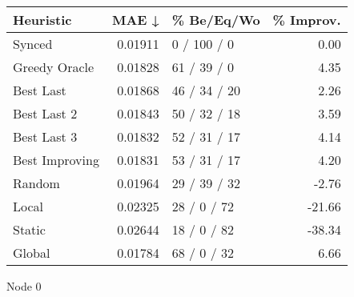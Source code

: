 \begin{tabular}{lrlr}
\toprule
\textbf{Heuristic} & \textbf{MAE ↓} & \textbf{\% Be/Eq/Wo} & \textbf{\% Improv.} \\
\midrule
            Synced &        0.01911 &          0 / 100 / 0 &                0.00 \\
     Greedy Oracle &        0.01828 &          61 / 39 / 0 &                4.35 \\
         Best Last &        0.01868 &         46 / 34 / 20 &                2.26 \\
       Best Last 2 &        0.01843 &         50 / 32 / 18 &                3.59 \\
       Best Last 3 &        0.01832 &         52 / 31 / 17 &                4.14 \\
    Best Improving &        0.01831 &         53 / 31 / 17 &                4.20 \\
            Random &        0.01964 &         29 / 39 / 32 &               -2.76 \\
             Local &        0.02325 &          28 / 0 / 72 &              -21.66 \\
            Static &        0.02644 &          18 / 0 / 82 &              -38.34 \\
            Global &        0.01784 &          68 / 0 / 32 &                6.66 \\
\bottomrule
\end{tabular}
\caption{Node 0}
\label{tab:iid_lr05_le2_bs2_0}
